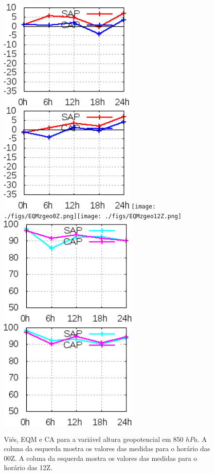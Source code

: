\begin{figure}[!hbp]
\includegraphics[height=5.5cm]{./figs/VIES850zgeo0Z.png}\includegraphics[height=5.5cm]{./figs/VIES850zgeo12Z.png}
\texttt{[image: ./figs/EQMzgeo0Z.png]}\texttt{[image: ./figs/EQMzgeo12Z.png]}
\includegraphics[height=5.5cm]{./figs/CA850zgeo0Z.png}\includegraphics[height=5.5cm]{./figs/CA850zgeo12Z.png}
\caption{Viés, EQM e CA para a variável altura geopotencial em 850 $hPa$. A coluna da esquerda mostra os valores das medidas para o horário das 00Z. A coluna da esquerda mostra os valores das medidas para o horário das 12Z.}
\label{fig53}
\end{figure}

